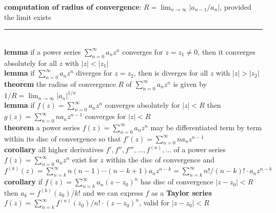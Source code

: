 \documentclass[a4paper]{article}
\newcommand*\abs[1]{\vert #1 \vert}
\newcommand*\linesep[0]{\noindent\rule{\textwidth}{0.5pt}\\}
\begin{document}
\begin{framed}
	\noindent
	\textbf{computation of radius of convergence}: $R = \lim_{n \rightarrow \infty} \abs{a_{n-1} / a_n}$, provided the limit exists\\
	
	
	
	\linesep
	
	\noindent
	\textbf{lemma} if a power series $\sum_{n=0}^\infty a_nz^n$ converges for $z = z_1 \neq 0$, then it converges absolutely for all $z$ with $\abs{z} < \abs{z_1}$\\
	
	\noindent
	\textbf{lemma} if $\sum_{n=0}^\infty a_nz^n$ diverges for $z = z_2$, then is diverges for all $z$ with $\abs{z} > \abs{z_2}$\\
	
	\noindent
	\textbf{theorem} the radius of convergence $R$ of $\sum_{n=0}^\infty a_nz^n$ is given by $1/R = \lim_{n \rightarrow \infty} \abs{a_n}^{1/n}$\\
	
	\noindent
	\textbf{lemma} if $f(z) = \sum_{n=0}^\infty a_nz^n$ converges absolutely for $\abs{z} < R$ then $g(z) = \sum_{n=0}^\infty na_nz^{n-1}$ converges for $\abs{z} < R$\\
	
	\noindent
	\textbf{theorem} a power series $f(z) = \sum_{n=0}^\infty a_nz^n$ may be differentiated term by term within its disc of convergence so that $f'(z) = \sum_{n=0}^\infty na_nz^{n-1}$\\
	
	\noindent
	\textbf{corollary} all higher derivatives $f', f'', f''', \dots, f^{(n)}, \dots$ of a power series $f(z) = \sum_{n=0}^\infty a_nz^n$ exist for $z$ within the disc of convergence and $f^{(k)}(z) = \sum_{n=k}^\infty n(n - 1)\cdots(n - k + 1)a_nz^{n - k} = \sum_{n=k}^\infty n!/(n - k)! \cdot a_nz^{n - k}$\\
	
	\noindent
	\textbf{corollary} if $f(z) = \sum_{n=k}^\infty a_n(z - z_0)^n$ has disc of convergence $\abs{z - z_0} < R$ then $a_k = f^{(k)}(z_0)/k!$ and we can express $f$ as a \textbf{Taylor series} $f(z) = \sum_{n=k}^\infty f^{(n)}(z_0)/n! \cdot (z - z_0)^n$, valid for $\abs{z - z_0} < R$
\end{framed}
\end{document}

